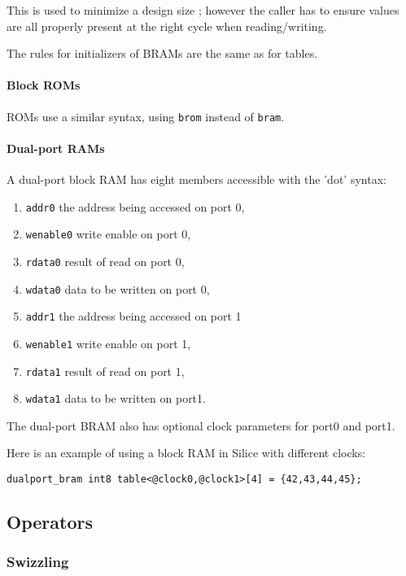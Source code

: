 \documentclass[a4]{article}
\newcommand\silice{Silice}
\begin{document}
This is used to minimize a design size ; however the caller has to ensure
values are all properly present at the right cycle when reading/writing.

The rules for initializers of BRAMs are the same as for tables.

\paragraph{Block ROMs}

ROMs use a similar syntax, using \texttt{brom} instead of \texttt{bram}.

\paragraph{Dual-port RAMs}

A dual-port block RAM has eight members accessible with the 'dot' syntax: 
\begin{enumerate}
	\item {\tt addr0} the address being accessed on port 0,
	\item {\tt wenable0} write enable on port 0,
	\item {\tt rdata0} result of read on port 0,
	\item {\tt wdata0} data to be written on port 0,
	\item {\tt addr1} the address being accessed on port 1
	\item {\tt wenable1} write enable on port 1,
	\item {\tt rdata1} result of read on port 1,
	\item {\tt wdata1} data to be written on port1.
\end{enumerate}

The dual-port BRAM also has optional clock parameters for port0 and port1.

Here is an example of using a block RAM in \silice{} with different clocks:

\begin{verbatim}
dualport_bram int8 table<@clock0,@clock1>[4] = {42,43,44,45};
\end{verbatim}


\subsection{Operators}

\subsubsection{Swizzling}
\end{document}
